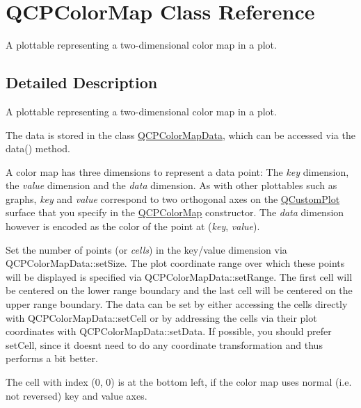 \hypertarget{class_q_c_p_color_map}{}\section{Q\+C\+P\+Color\+Map Class Reference}
\label{class_q_c_p_color_map}


A plottable representing a two-\/dimensional color map in a plot.  




\subsection{Detailed Description}
A plottable representing a two-\/dimensional color map in a plot. 



The data is stored in the class \mbox{\hyperlink{class_q_c_p_color_map_data}{Q\+C\+P\+Color\+Map\+Data}}, which can be accessed via the data() method.

A color map has three dimensions to represent a data point\+: The {\itshape key} dimension, the {\itshape value} dimension and the {\itshape data} dimension. As with other plottables such as graphs, {\itshape key} and {\itshape value} correspond to two orthogonal axes on the \mbox{\hyperlink{class_q_custom_plot}{Q\+Custom\+Plot}} surface that you specify in the \mbox{\hyperlink{class_q_c_p_color_map}{Q\+C\+P\+Color\+Map}} constructor. The {\itshape data} dimension however is encoded as the color of the point at ({\itshape key}, {\itshape value}).

Set the number of points (or {\itshape cells}) in the key/value dimension via Q\+C\+P\+Color\+Map\+Data\+::set\+Size. The plot coordinate range over which these points will be displayed is specified via Q\+C\+P\+Color\+Map\+Data\+::set\+Range. The first cell will be centered on the lower range boundary and the last cell will be centered on the upper range boundary. The data can be set by either accessing the cells directly with Q\+C\+P\+Color\+Map\+Data\+::set\+Cell or by addressing the cells via their plot coordinates with Q\+C\+P\+Color\+Map\+Data\+::set\+Data. If possible, you should prefer set\+Cell, since it doesn\textquotesingle{}t need to do any coordinate transformation and thus performs a bit better.

The cell with index (0, 0) is at the bottom left, if the color map uses normal (i.\+e. not reversed) key and value axes.

